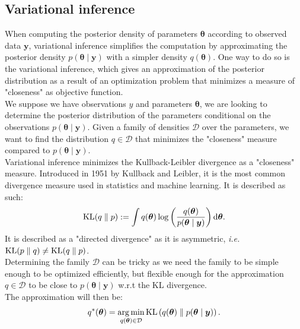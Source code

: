 \documentclass{article}
\DeclareMathOperator*{\argmin}{arg\,min}
\DeclareMathOperator*{\KL}{{\rm KL}}
\begin{document}
\subsection{Variational inference}
When computing the posterior density of parameters $\boldsymbol{\theta}$ according to observed data $\boldsymbol{y}$, variational inference simplifies the computation by approximating the posterior density $p(\boldsymbol{\theta}\mid \boldsymbol{y})$ with a simpler density $q(\boldsymbol{\theta})$. One way to do so is the variational inference, which gives an approximation of the posterior distribution as a result of an optimization problem that minimizes a measure of "closeness" as objective function.\\
\newline
%
We suppose we have observations $y$ and parameters $\boldsymbol{\theta}$, we are looking to determine the posterior distribution of the parameters conditional on the observations $p(\boldsymbol{\theta} \mid \boldsymbol{y})$. Given a family of densities $\mathcal{D}$ over the parameters, we want to find the distribution $q \in \mathcal{D}$ that minimizes the "closeness" measure compared to $p(\boldsymbol{\theta} \mid \boldsymbol{y})$.\\
\newline
%
Variational inference minimizes the Kullback-Leibler divergence as a "closeness" measure. Introduced in 1951 by Kullback and Leibler\cite{kl51}, it is the most common divergence measure used in statistics and machine learning. It is described as such:
\begin{equation*}
\KL(q\parallel p) := \int q(\boldsymbol{\theta})\log \left(\frac{q(\boldsymbol{\theta})}{p(\boldsymbol{\theta} \mid \boldsymbol{y})}\right) \mathrm{d}\boldsymbol{\theta}.
\end{equation*} 
It is described as a "directed divergence" as it is asymmetric, \textit{i.e.} $\KL(p\parallel q) \neq \KL(q \parallel p)$.\\
\newline
%
Determining the family $\mathcal{D}$ can be tricky as we need the family to be simple enough to be optimized efficiently, but flexible enough for the approximation $q \in \mathcal{D}$ to be close to $p(\boldsymbol{\theta} \mid \boldsymbol{y})$ w.r.t the KL divergence.\\
\newline
%
The approximation will then be:
\begin{equation*}
q^*(\boldsymbol{\theta} ) = \argmin_{q(\boldsymbol{\theta}) \in \mathcal{D}} \KL\left( q(\boldsymbol{\theta}) \parallel p(\boldsymbol{\theta} \mid \boldsymbol{y})\right).
\end{equation*}
\end{document}
